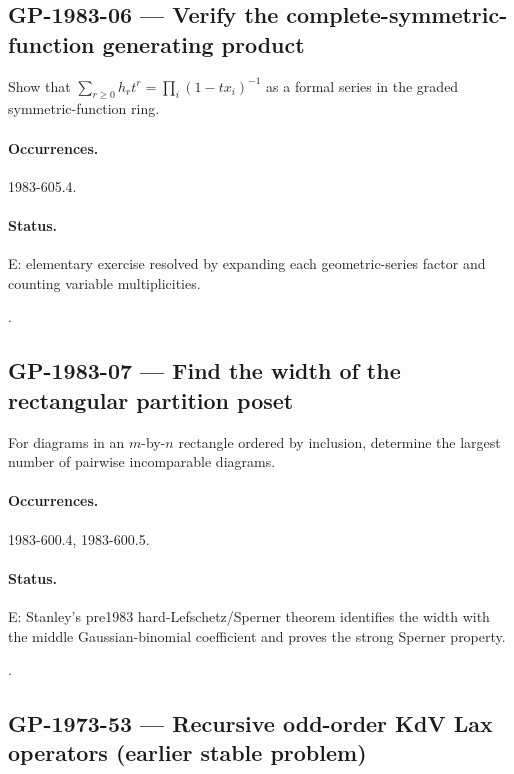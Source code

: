 \subsection{GP-1983-06 --- Verify the complete-symmetric-function generating product}

\label{problem:GP-1983-06}

Show that \(\sum_{r\ge0}h_rt^r=\prod_i(1-tx_i)^{-1}\) as a formal series in the graded symmetric-function ring.

\paragraph{Occurrences.} 1983-605.4.

\paragraph{Status.} E: elementary exercise resolved by expanding each geometric-series factor and counting variable multiplicities.

\noindent\citep{macdonald1995symmetric}.

\subsection{GP-1983-07 --- Find the width of the rectangular partition poset}

\label{problem:GP-1983-07}

For diagrams in an \(m\)-by-\(n\) rectangle ordered by inclusion, determine the largest number of pairwise incomparable diagrams.

\paragraph{Occurrences.} 1983-600.4, 1983-600.5.

\paragraph{Status.} E: Stanley's pre1983 hard-Lefschetz/Sperner theorem identifies the width with the middle Gaussian-binomial coefficient and proves the strong Sperner property.

\noindent\citep{stanley1980weyl,stanley1984lefschetz}.

\subsection{GP-1973-53 --- Recursive odd-order KdV Lax operators (earlier stable problem)}

